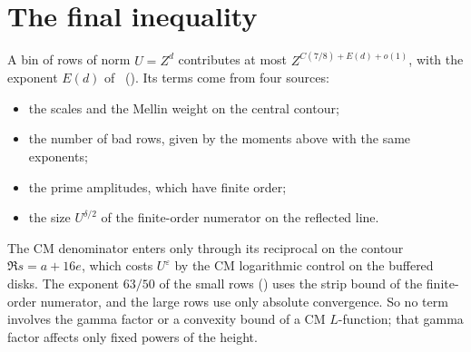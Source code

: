 \documentclass[11pt]{article}
\numberwithin{equation}{section}
\begin{document}
\section{The final inequality}\label{sec:78final}
A bin of rows of norm $U=Z^d$ contributes at most $Z^{C(7/8)+E(d)+o(1)}$, with the exponent
$E(d)$ of~\cite[eq.~(20.4)]{OAI78} \cite[\S6]{G78} (\cite[Lemma~20.1]{OAI78}). Its terms come
from four sources:
\begin{itemize}
\item the scales and the Mellin weight on the central contour;
\item the number of bad rows, given by the moments above with the same exponents;
\item the prime amplitudes, which have finite order;
\item the size $U^{\delta/2}$ of the finite-order numerator on the reflected line.
\end{itemize}
The CM denominator enters only through its reciprocal on the contour $\Re s=a+16e$, which costs $U^{\varepsilon}$
by the CM logarithmic control on the buffered disks. The exponent $63/50$ of the small rows
(\cite[proof of Lemma~10.6]{OAI78}) uses the strip bound of the finite-order numerator, and the large rows use only absolute
convergence. So no term involves the gamma factor or a convexity bound of a CM $L$-function; that gamma factor
affects only fixed powers of the height.
\end{document}
